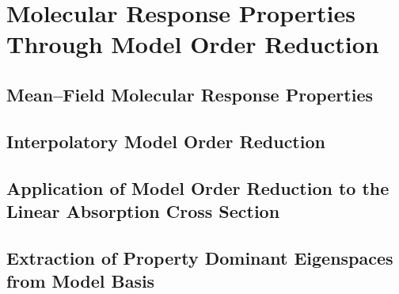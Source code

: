 \chapter{Molecular Response Properties Through Model Order Reduction}

\section{Mean--Field Molecular Response Properties}

\section{Interpolatory Model Order Reduction}

\section{Application of Model Order Reduction to the Linear Absorption 
  Cross Section}

\section{Extraction of Property Dominant Eigenspaces from Model Basis}


